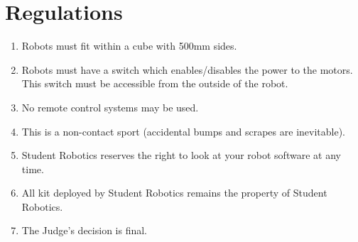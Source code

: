 \section {Regulations}
\label{regs}

\begin{enumerate}
\item Robots must fit within a cube with 500mm sides.
\item Robots must have a switch which enables/disables the power to the motors.  This switch must be accessible from the outside of the robot.
\item No remote control systems may be used.
\item This is a non-contact sport (accidental bumps and scrapes are inevitable).
\item Student Robotics reserves the right to look at your robot software at any time.
\item All kit deployed by Student Robotics remains the property of Student Robotics.
\item The Judge's decision is final.
\end{enumerate}
